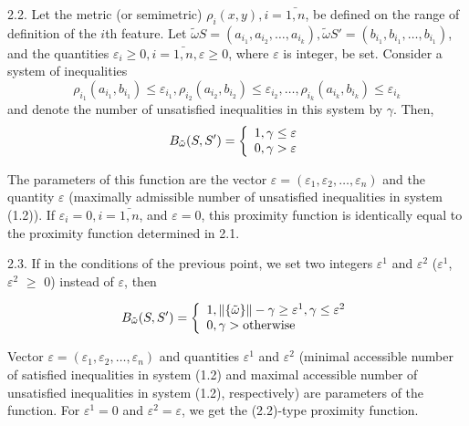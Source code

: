 2.2. Let the metric (or semimetric) $\rho_i(x, y), i = \bar{1,n}$, be defined on the 
range of definition of the $i$th feature. 
Let $\tilde{\omega}S=(a_{i_1}, a_{i_2}, \ldots, a_{i_k}), \tilde{\omega}S' = (b_{i_1}, b_{i_1}, \ldots, b_{i_1})$,
and the quantities $\varepsilon_i \geq 0, i = \bar{1, n}, \varepsilon \geq 0$, where $\varepsilon$ 
is integer, be set. Consider a system of inequalities
\begin{equation}
	\rho_{i_1}(a_{i_1}, b_{i_1}) \leq \varepsilon_{i_1},
	\rho_{i_2}(a_{i_2}, b_{i_2}) \leq \varepsilon_{i_2},
	\ldots,
	\rho_{i_k}(a_{i_k}, b_{i_k}) \leq \varepsilon_{i_k}	
\end{equation}
and denote the number of unsatisfied inequalities in this system by $\gamma$. Then,
\begin{equation}
B_{\tilde{\omega}}(S,S') = \left\{ 
  \begin{array}{l l}
    1, \gamma \leq \varepsilon \\
    0, \gamma > \varepsilon
  \end{array} \right.
\end{equation}

The parameters of this function are the vector 
$\varepsilon = (\varepsilon_1, \varepsilon_2, \ldots, \varepsilon_n)$ 
and the quantity $\varepsilon$ (maximally admissible number of unsatisfied 
inequalities in system (1.2)). If $\varepsilon_i = 0, i = \bar{1,n}$, and $\varepsilon = 0$, this 
proximity function is identically equal to the proximity 
function determined in 2.1.

2.3.  If in the conditions of the previous point, we set two 
integers $\varepsilon^1$ and $\varepsilon^2$ ($\varepsilon^1$, $\varepsilon^2$ $\geq$ 0) instead 
of $\varepsilon$, then

\begin{equation}
B_{\tilde{\omega}}(S, S') = \left\{ 
  \begin{array}{l l}
    1, \|\{\tilde{\omega}\}\| - \gamma \geq \varepsilon^1,\gamma \leq \varepsilon^2 \\
    0, \gamma > \text{otherwise}
  \end{array} \right.
\end{equation}

Vector $\varepsilon = (\varepsilon_1, \varepsilon_2, \ldots , \varepsilon_n)$ and 
quantities $\varepsilon^1$ and $\varepsilon^2$ (minimal accessible 
number of satisfied inequalities in system (1.2) and maximal accessible number 
of unsatisfied inequalities in system (1.2), respectively) are parameters of 
the function. For $\varepsilon^1 = 0$ and $\varepsilon^2 = \varepsilon$, we get the (2.2)-type proximity function.

